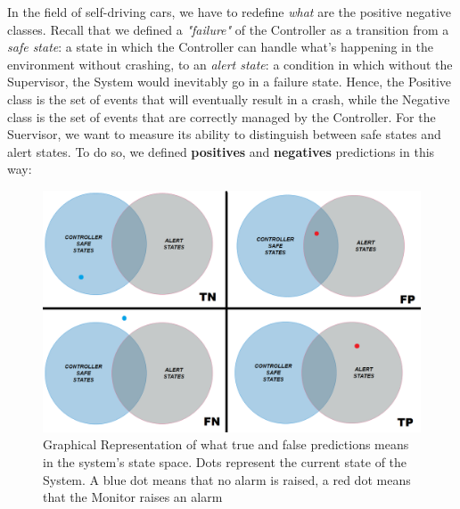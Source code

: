 In the field of self-driving cars, we have to redefine \textsl{what} are the positive negative classes.
Recall that we defined a \textsl{"failure"} of the Controller as a transition from a \textsl{safe state}: a state in which the Controller can handle what's happening in the environment without crashing, to an \textsl{alert state}: a condition in which without the Supervisor, the System would inevitably go in a failure state. Hence, the Positive class is the set of events that will eventually result in a crash, while the Negative class is the set of events that are correctly managed by the Controller.
For the Suervisor, we want to measure its ability to distinguish between safe states and alert states. To do so, we defined \textbf{positives} and \textbf{negatives} predictions in this way:

\vspace{0.5cm}

\begin{figure}[h!]
	\includegraphics[width=\textwidth]{img/positive-negative-set.png}
	\caption{Graphical Representation of what true and false predictions means in the system's state space. Dots represent the current state of the System. A blue dot means that no alarm is raised, a red dot means that the Monitor raises an alarm}
\end{figure}

